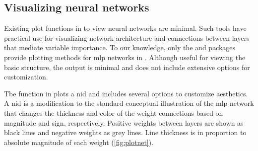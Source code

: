 \documentclass[article,shortnames]{jss}
\begin{document}
\subsection{Visualizing neural networks}

Existing plot functions in  to view neural networks are minimal.  Such tools have practical use for visualizing network architecture and connections between layers that mediate variable importance. To our knowledge, only the  and  packages provide plotting methods for \ac{mlp} networks in .  Although useful for viewing the basic structure, the output is minimal and does not include extensive options for customization.

Tbe  function in  plots a \acl{nid} \citep[\acs{nid},][]{Ozesmi99} and includes several options to customize aesthetics. A \ac{nid} is a modification to the standard conceptual illustration of the \ac{mlp} network that changes the thickness and color of the weight connections based on magnitude and sign, respectively.  Positive weights between layers are shown as black lines and negative weights as grey lines. Line thickness is in proportion to absolute magnitude of each weight (\cref{fig:plotnet}).
\end{document}
